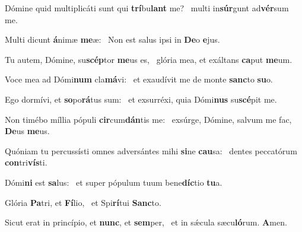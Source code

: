 \item Dómine quid multiplicáti sunt qui \textbf{trí}bu\textbf{lant} me?~\psstar{} multi in\textbf{súr}gunt ad\textbf{vér}sum me.
\item Multi dicunt \textbf{á}nimæ \textbf{me}æ:~\psstar{} Non est salus ipsi in \textbf{De}o \textbf{e}jus.
\item Tu autem, Dómine, su\textbf{scép}tor \textbf{me}us es,~\psstar{} glória mea, et exáltans \textbf{ca}put \textbf{me}um.
\item Voce mea ad Dómi\textbf{num} cla\textbf{má}vi:~\psstar{} et exaudívit me de monte \textbf{sanc}to \textbf{su}o.
\item Ego dormívi, et \textbf{so}po\textbf{rá}tus sum:~\psstar{} et exsurréxi, quia Dómi\textbf{nus} su\textbf{scé}pit me.
\item Non timébo míllia pópuli \textbf{cir}cum\textbf{dán}tis me:~\psstar{} exsúrge, Dómine, salvum me fac, \textbf{De}us \textbf{me}us.
\item Quóniam tu percussísti omnes adversántes mihi \textbf{si}ne \textbf{cau}sa:~\psstar{} dentes peccatórum \textbf{con}tri\textbf{vís}ti.
\item Dómi\textbf{ni} est \textbf{sa}lus:~\psstar{} et super pópulum tuum bene\textbf{díc}tio \textbf{tu}a.
\item Glória \textbf{Pa}tri, et \textbf{Fí}lio,~\psstar{} et Spi\textbf{rí}tui \textbf{Sanc}to.
\item Sicut erat in princípio, et \textbf{nunc}, et \textbf{sem}per,~\psstar{} et in sǽcula sæcu\textbf{ló}rum. \textbf{A}men.
